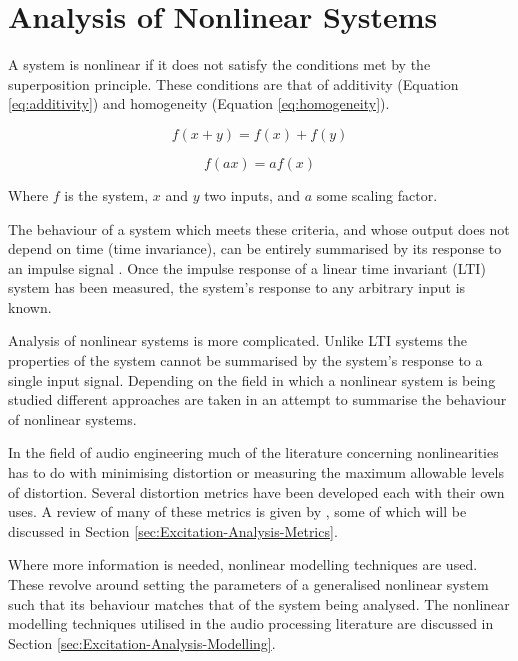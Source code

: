 \section{Analysis of Nonlinear Systems}
\label{sec:Excitation-AnalysisOfNonlinearSystems}
	A system is nonlinear if it does not satisfy the conditions met by the superposition principle. These conditions
	are that of additivity (Equation \ref{eq:additivity}) and homogeneity (Equation \ref{eq:homogeneity}).

	\begin{equation}
		f(x + y) = f(x) + f(y) 
		\label{eq:additivity}
	\end{equation}

	\begin{equation}
		f(ax) = af(x)
		\label{eq:homogeneity}
	\end{equation}

	Where $f$ is the system, $x$ and $y$ two inputs, and $a$ some scaling factor.

	The behaviour of a system which meets these criteria, and whose output does not depend on time (time invariance),
	can be entirely summarised by its response to an impulse signal \citep{phillips2007signals}. Once the impulse
	response of a linear time invariant (LTI) system has been measured, the system's response to any arbitrary input is
	known. 

	Analysis of nonlinear systems is more complicated. Unlike LTI systems the properties of the system cannot be
	summarised by the system's response to a single input signal. Depending on the field in which a nonlinear system is
	being studied different approaches are taken in an attempt to summarise the behaviour of nonlinear systems.

	In the field of audio engineering much of the literature concerning nonlinearities has to do with minimising
	distortion or measuring the maximum allowable levels of distortion. Several distortion metrics have been developed
	each with their own uses. A review of many of these metrics is given by \cite{voishvillo2006assessment}, some of
	which will be discussed in Section \ref{sec:Excitation-Analysis-Metrics}.

	Where more information is needed, nonlinear modelling techniques are used. These revolve around setting the
	parameters of a generalised nonlinear system such that its behaviour matches that of the system being analysed. The
	nonlinear modelling techniques utilised in the audio processing literature are discussed in Section
	\ref{sec:Excitation-Analysis-Modelling}.

